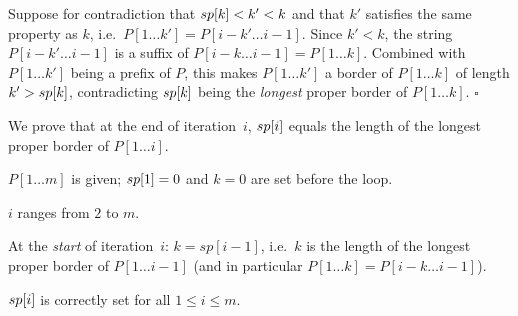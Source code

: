 \begin{formaldetails}
  Suppose for contradiction that $sp\kern0pt[k] < k' < k$ and that $k'$ satisfies
  the same property as $k$, i.e.\ $P[1\ldots k'] = P[i-k'\ldots i-1]$.
  Since $k' < k$, the string $P[i-k'\ldots i-1]$ is a suffix of
  $P[i-k\ldots i-1] = P[1\ldots k]$.
  Combined with $P[1\ldots k']$ being a prefix of $P$, this makes
  $P[1\ldots k']$ a border of $P[1\ldots k]$ of length $k' > sp\kern0pt[k]$,
  contradicting $sp\kern0pt[k]$ being the \emph{longest} proper border of
  $P[1\ldots k]$. \hfill$\square$
\end{formaldetails}

\begin{formaldetails}
  We prove that at the end of iteration~$i$, $sp\kern0pt[i]$ equals the length of the
  longest proper border of $P[1\ldots i]$.

  \begin{loopproof}
    \item[Precondition]  $P[1\ldots m]$ is given; $sp\kern0pt[1]=0$ and $k=0$ are set before the loop.
    \item[Loop guard]    $i$ ranges from $2$ to $m$.
    \item[Invariant]     At the \emph{start} of iteration~$i$:
                         $k = sp[i{-}1]$, i.e.\ $k$ is the length of the longest
                         proper border of $P[1\ldots i{-}1]$ (and in particular
                         $P[1\ldots k] = P[i{-}k\ldots i{-}1]$).
    \item[Postcondition] $sp\kern0pt[i]$ is correctly set for all $1 \le i \le m$.
  \end{loopproof}

  \lprulesep


\end{formaldetails}

